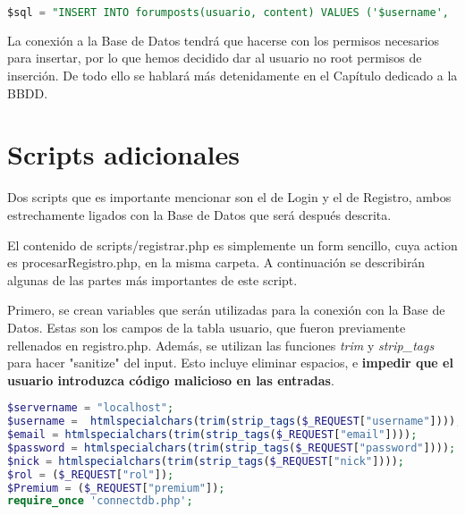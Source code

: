 \documentclass[12pt]{report}
\begin{document}
\begin{lstlisting}[language=SQL]
$sql = "INSERT INTO forumposts(usuario, content) VALUES ('$username', '$contenido')";
\end{lstlisting}
La conexión a la Base de Datos tendrá que hacerse con los permisos necesarios para insertar, por lo que hemos decidido dar al usuario no root permisos de inserción. De todo ello se hablará más detenidamente en el Capítulo dedicado a la BBDD.

 \newpage
\section{Scripts adicionales}
Dos scripts que es importante mencionar son el de Login y el de Registro, ambos estrechamente ligados con la Base de Datos que será después descrita. 

El contenido de scripts/registrar.php es simplemente un form sencillo, cuya action es procesarRegistro.php, en la misma carpeta. A continuación se describirán algunas de las partes más importantes de este script.

Primero, se crean variables que serán utilizadas para la conexión con la Base de Datos. Estas son los campos de la tabla usuario, que fueron previamente rellenados en registro.php. Además, se utilizan las funciones \textit{trim} y \textit{strip\_tags} para hacer "sanitize" del input. Esto incluye eliminar espacios, e \textbf{impedir que el usuario introduzca código malicioso en las entradas}.
\newline
\begin{lstlisting}[language=PHP]
$servername = "localhost";
$username =  htmlspecialchars(trim(strip_tags($_REQUEST["username"])));
$email = htmlspecialchars(trim(strip_tags($_REQUEST["email"])));
$password = htmlspecialchars(trim(strip_tags($_REQUEST["password"])));
$nick = htmlspecialchars(trim(strip_tags($_REQUEST["nick"])));
$rol = ($_REQUEST["rol"]);
$Premium = ($_REQUEST["premium"]);
require_once 'connectdb.php';
\end{lstlisting}
\end{document}
